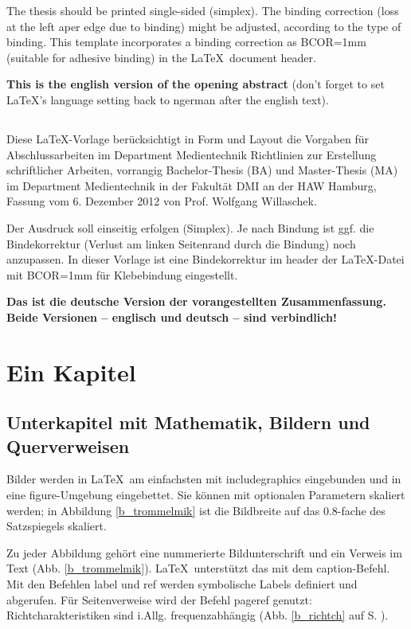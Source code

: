 The thesis should be printed single-sided (simplex). The binding correction (loss at the left aper edge due to binding) might be adjusted, according to the type of binding. This template incorporates a binding correction as BCOR=1mm (suitable for adhesive binding) in the \LaTeX\ document header.

{\bfseries This is the english version of the opening abstract} (don't forget to set \LaTeX's language setting back to ngerman after the english text). 
 
 
\section*{\centering\abstractname}
Diese \LaTeX-Vorlage ber{\"u}cksichtigt in Form und Layout die Vorgaben f{\"u}r Abschlussarbeiten im Department Medientechnik \glqq Richtlinien zur Erstellung schriftlicher Arbeiten, vorrangig Bachelor-Thesis (BA) und Master-Thesis (MA) im Department Medientechnik in der Fakult{\"a}t DMI an der HAW Hamburg\grqq, Fassung vom 6. Dezember 2012 von Prof. Wolfgang Willaschek.
 
Der Ausdruck soll einseitig erfolgen (Simplex). Je nach Bindung ist ggf. die Bindekorrektur (Verlust am linken Seitenrand durch die Bindung) noch anzupassen. In dieser Vorlage ist eine Bindekorrektur im header der \LaTeX-Datei mit BCOR=1mm f{\"u}r Klebebindung eingestellt.

{\bfseries Das ist die deutsche Version der vorangestellten Zusammenfassung. Beide Versionen -- englisch und deutsch -- sind verbindlich!}



\chapter{Ein Kapitel}

\section{Unterkapitel mit Mathematik, Bildern und Querverweisen}

Bilder werden in \LaTeX\ am einfachsten mit includegraphics eingebunden und in eine figure-Umgebung eingebettet. Sie können mit optionalen Parametern skaliert werden; in Abbildung \ref{b_trommelmik} ist die Bildbreite auf das 0.8-fache des Satzspiegels skaliert.

Zu jeder Abbildung gehört eine nummerierte Bildunterschrift und ein Verweis im Text (Abb. \ref{b_trommelmik}). \LaTeX\ unterstützt das mit dem caption-Befehl. Mit den Befehlen label und ref werden symbolische Labels definiert und abgerufen. Für Seitenverweise wird der Befehl pageref genutzt: Richtcharakteristiken sind i.Allg. frequenzabhängig (Abb. \ref{b_richtch} auf S. \pageref{b_richtch}). 

